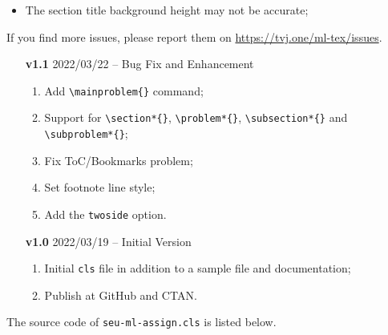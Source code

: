 \documentclass[twoside]{seu-ml-assign}
\begin{document}
  \label{sec:known_issues}

    \begin{itemize}
      \item The section title background height may not be accurate;
    \end{itemize}

    If you find more issues, please report them on \url{https://tvj.one/ml-tex/issues}.


    \begin{multicols}{2}
      \begin{itemize}
        \item [\textbf{v1.1}] 2022/03/22 -- Bug Fix and Enhancement
          \begin{enumerate}
            \item Add \verb|\mainproblem{}| command;
            \item Support for \verb|\section*{}|, \verb|\problem*{}|, \verb|\subsection*{}| and \verb|\subproblem*{}|;
            \item Fix ToC/Bookmarks problem;
            \item Set footnote line style;
            \item Add the \texttt{twoside} option.
          \end{enumerate}
        \item [\textbf{v1.0}] 2022/03/19 -- Initial Version
          \begin{enumerate}
            \item Initial \texttt{cls} file in addition to a sample file and documentation;
            \item Publish at GitHub and CTAN.
          \end{enumerate}
      \end{itemize}
    \end{multicols}


    The source code of \texttt{seu-ml-assign.cls} is listed below.

    
\end{document}
